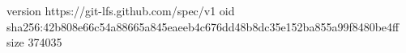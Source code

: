 version https://git-lfs.github.com/spec/v1
oid sha256:42b808e66c54a88665a845eaeeb4c676dd48b8dc35e152ba855a99f8480be4ff
size 374035
